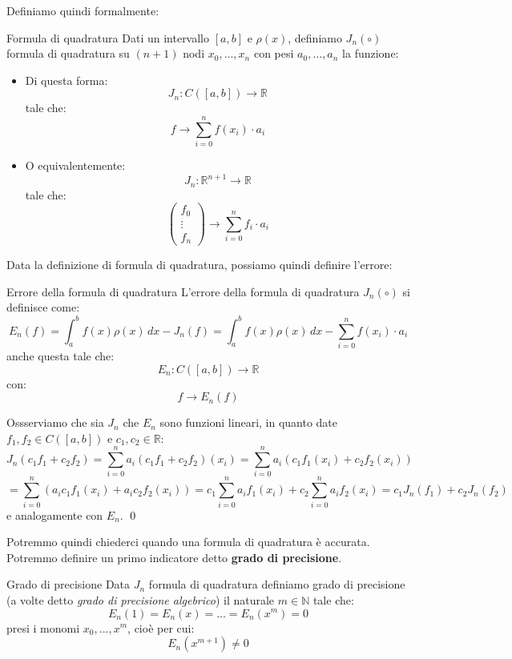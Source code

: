 \documentclass[a4paper,11pt]{article}
\begin{document}
Definiamo quindi formalmente:
\begin{definition}{Formula di quadratura}
	Dati un intervallo $[a, b]$ e $\rho(x)$, definiamo $J_n(\circ)$ formula di quadratura su $(n + 1)$ nodi $x_0, ..., x_n$ con pesi $a_0, ..., a_n$ la funzione:
	\begin{itemize}
		\item Di questa forma:
	$$
	J_n : C\left([a, b]\right) \rightarrow \mathbb{R}
	$$
	tale che:
	$$
	f \rightarrow \sum_{i=0}^n f(x_i) \cdot a_i
	$$
		\item
	O equivalentemente:
	$$
	J_n : \mathbb{R}^{n + 1} \rightarrow \mathbb{R}
	$$
	tale che:
	$$
	\begin{pmatrix}
		f_0 \\ \vdots \\ f_n
	\end{pmatrix} 
	\rightarrow
	\sum_{i=0}^n f_i \cdot a_i
	$$
	\end{itemize}
\end{definition}

\noindent
\begin{minipage}{\textwidth}
Data la definizione di formula di quadratura, possiamo quindi definire l'errore:
\begin{definition}{Errore della formula di quadratura}
	L'errore della formula di quadratura $J_n(\circ)$ si definisce come:
	$$
	E_n(f) = \int_a^b f(x) \rho(x) \, dx - J_n(f) = \int_a^b f(x) \rho(x) \, dx - \sum_{i = 0}^n f(x_i) \cdot a_i
	$$
	anche questa tale che:
	$$
	E_n : C\left([a, b]\right) \rightarrow \mathbb{R}
	$$
	con:
	$$
	f \rightarrow E_n(f)
	$$
\end{definition}
\end{minipage}

Ossserviamo che sia $J_n$ che $E_n$ sono funzioni lineari, in quanto date $f_1, f_2 \in C\left([a, b]\right)$ e $c_1, c_2 \in \mathbb{R}$:
$$
J_n (c_1 f_1 + c_2 f_2) = \sum_{i = 0}^n a_i (c_1 f_1 + c_2 f_2)(x_i) 
= \sum_{i = 0}^n a_i ( c_1 f_1(x_i) + c_2 f_2(x_i) )
$$
$$
= \sum_{i = 0}^n \left( a_i c_1 f_1 (x_i) + a_i c_2 f_2 (x_i) \right)
= c_1 \sum_{i = 0}^n a_i f_1 (x_i) + c_2 \sum_{i = 0}^n a_i f_2 (x_i)
= c_1 J_n(f_1) + c_2 J_n(f_2)
$$
e analogamente con $E_n$. \qed

Potremmo quindi chiederci quando una formula di quadratura è accurata.
Potremmo definire un primo indicatore detto \textbf{grado di precisione}.
\begin{definition}{Grado di precisione}
	Data $J_n$ formula di quadratura definiamo grado di precisione (a volte detto \textit{grado di precisione algebrico}) il naturale $m \in \mathbb{N}$ tale che:
	$$
		E_n(1) = E_n(x) = ... = E_n (x^m) = 0
	$$
	presi i monomi $x_0, ..., x^m$, cioè per cui:
	$$
	E_n(x^{m + 1}) \neq 0
	$$
\end{definition}
\end{document}
